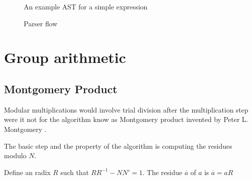 \begin{figure}[hbt!]
  \centering
  \caption{An example AST for a simple expression}
  \label{fig:simple_ast}
\end{figure}

\begin{figure}[hbt!]
  \centering
  \caption{Parser flow}
  \label{fig:ast}
\end{figure}

\filbreak

\section{Group arithmetic}

\subsection{Montgomery Product}

Modular multiplications would involve trial division after the
multiplication step were it not for the algorithm know as Montgomery
product invented by Peter L. Montgomery \cite{Montgomery}.

The basic step and the property of the algorithm is computing the
residues modulo $N$.

\begin{defn}
  Define an radix $R$ such that $R R^{-1} - N N' = 1$. The residue
  $\overline{a}$ of $a$ is $\overline{a} = a R$
\end{defn}

